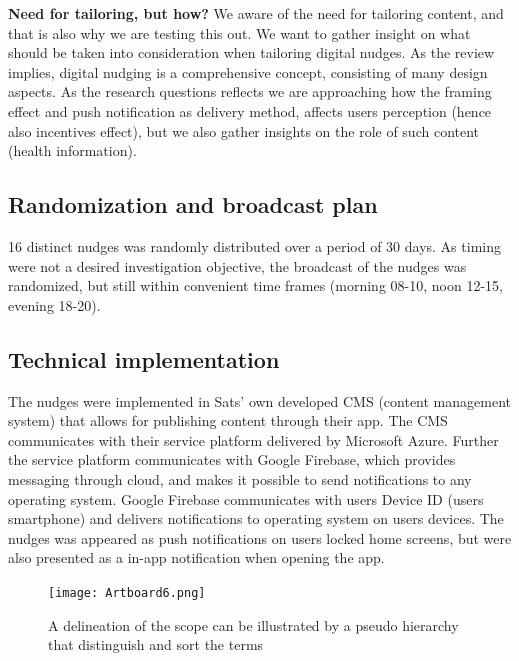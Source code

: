 \textbf{Need for tailoring, but how?}
We aware of the need for tailoring content, and that is also why we are testing this out. We want to gather insight on what should be taken into consideration when tailoring digital nudges. As the review implies, digital nudging is a comprehensive concept, consisting of many design aspects. As the research questions reflects we are approaching how the framing effect and push notification as delivery method, affects users perception (hence also incentives effect), but we also gather insights on the role of such content (health information).  


\subsection{Randomization and broadcast plan}
16 distinct nudges was randomly distributed over a period of 30 days. As timing were not a desired investigation objective, the broadcast of the nudges was randomized, but still within convenient time frames (morning 08-10, noon 12-15, evening 18-20). 

\subsection{Technical implementation}
The nudges were implemented in Sats' own developed CMS (content management system) that allows for publishing content through their app. The CMS communicates with their service platform delivered by Microsoft Azure. Further the service platform communicates with Google Firebase, which provides messaging through cloud, and makes it possible to send notifications to any operating system. Google Firebase communicates with users Device ID (users smartphone) and delivers notifications to operating system on users devices. The nudges was appeared as push notifications on users locked home screens, but were also presented as a in-app notification when opening the app. 


\bigbreak
\bigbreak
\begin{figure}[ht]
\texttt{[image: Artboard6.png]}
\caption{A delineation of the scope can be illustrated by a pseudo hierarchy that distinguish and sort the terms}
\end{figure}
\bigbreak
\bigbreak


